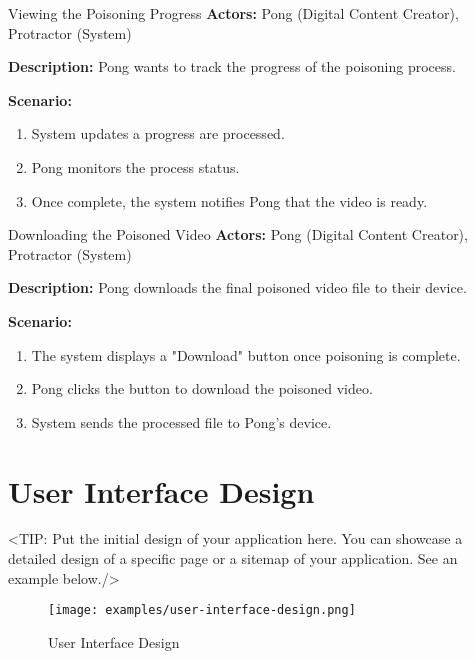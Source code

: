 \begin{usecase}{Viewing the Poisoning Progress}
    \textbf{Actors:} Pong (Digital Content Creator), Protractor (System)

    \textbf{Description:} Pong wants to track the progress of the poisoning process.

    \textbf{Scenario:}
    \begin{enumerate}[leftmargin=80pt]
        \item System updates a progress are processed.
        \item Pong monitors the process status.
        \item Once complete, the system notifies Pong that the video is ready.
    \end{enumerate}
\end{usecase}

\begin{usecase}{Downloading the Poisoned Video}
    \textbf{Actors:} Pong (Digital Content Creator), Protractor (System)

    \textbf{Description:} Pong downloads the final poisoned video file to their device.

    \textbf{Scenario:}
    \begin{enumerate}[leftmargin=80pt]
        \item The system displays a "Download" button once poisoning is complete.
        \item Pong clicks the button to download the poisoned video.
        \item System sends the processed file to Pong’s device.
    \end{enumerate}
\end{usecase}


\section{User Interface Design}
\label{section:user-interface-design}
<TIP: Put the initial design of your application here. You can
showcase a detailed design of a specific page or a sitemap of your application.
See an example below./>

\begin{figure}[h]
    \centering
    \texttt{[image: examples/user-interface-design.png]}
    \caption{User Interface Design}
\end{figure}